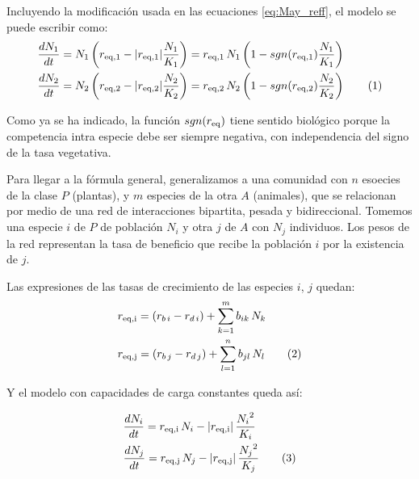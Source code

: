 Incluyendo la modificación usada en las ecuaciones \ref{eq:May_reff}, el modelo se puede escribir como:
\begin{align*}
\displaystyle & \frac{dN_1}{dt}= N_{1} \left( r_{\rm{eq},1}- |r_{\rm{eq},1}| \frac{N_1}{K_1} \right) = r_{\rm{eq},1}\, N_1 \left(1-sgn(r_{\rm{eq},1})\frac{N_1}{K_1}\right)\\
\displaystyle & \frac{dN_2}{dt}= N_{2} \left( r_{\rm{eq},2}- |r_{\rm{eq},2}| \frac{N_2}{K_2} \right)= r_{\rm{eq},2}\, N_2 \left(1-sgn(r_{\rm{eq},2})\frac{N_2}{K_2}\right)
\stepcounter{equation}\tag{\theequation}\label{eq:new_model}
\end{align*}

Como ya se ha indicado, la función $sgn(r_{\rm{eq}})$ tiene sentido biológico porque la competencia intra especie debe ser siempre negativa, con independencia del signo de la tasa vegetativa.

Para llegar a la fórmula general, generalizamos a una comunidad con $n$ esoecies de la clase $P$ (plantas), y $m$ especies de la otra $A$ (animales), que se relacionan por medio de una red de interacciones bipartita, pesada y bidireccional. Tomemos una especie $i$ de $P$ de población $N_i$ y otra $j$ de $A$ con $N_j$ individuos. Los pesos de la red representan la tasa de beneficio que recibe la población $i$ por la existencia de $j$. 

Las expresiones de las tasas de crecimiento de las especies $i$, $j$ quedan:
\begin{align*}
\displaystyle & r_{\rm{eq},i}  = \left( r_{b\, i} - r_{d\, i} \right) + \sum\limits_{k=1}^{m} b_{ik}\, N_k  \\
\displaystyle & r_{\rm{eq},j}  = \left( r_{b\, j} - r_{d\, j} \right) + \sum\limits_{l=1}^{n} b_{jl}\, N_l
\stepcounter{equation}\tag{\theequation}\label{modelors}
\end{align*}

Y el modelo con capacidades de carga constantes queda así:

\begin{theo}
\begin{align*}
\displaystyle
&\frac{dN_i}{dt}=r_{\rm{eq},i}\, N_i - |r_{\rm{eq},i}| \, \frac{{N_i}^2}{K_i}  \\
\displaystyle
&\frac{dN_j}{dt}=r_{\rm{eq},j} \, N_j - |r_{\rm{eq},j}| \, \frac{{N_j}^2}{K_j}
\stepcounter{equation}\tag{\theequation}\label{modelo_optionI}
\end{align*}
\end{theo}

